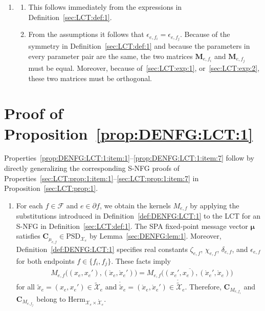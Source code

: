 \documentclass[journal]{IEEEtran}
\newcommand{\add}[1]{{\color{black}#1}}
\newcommand{\vect}[1]{ \bm{#1} }
\newcommand{\set}[1]{\mathcal{#1}}
\newcommand{\setF}{ \mathcal{F} }
\newcommand{\setpf}{ \partial f }
\newcommand{\xe}{ x_{e} }
\newcommand{\vmu}{ \vect{ \mu } }
\newcommand{\setHerm}[1]{ \mathrm{Herm}_{#1} }
\newcommand{\setPSD}[1]{ \mathrm{PSD}_{#1} }
\newcommand{\tset}[1]{\tilde{\mathcal{#1}}}
\newcommand{\matr}[1]{\vect{#1}}
\newcommand{\LCTtset}[1]{\mathring{\tilde{\mathcal{#1}}}}
\newcommand{\LCTset}[1]{\mathring{\mathcal{#1}}}
\newcommand{\LCT}[1]{ \mathring{#1} }
\newcommand{\LCTt}[1]{ \mathring{ \tilde{#1} } }
\newcommand{\ef}{ e,f }
\newcommand{\efi}{ e,f_i }
\newcommand{\efj}{ e,f_j }
\newcommand{\txe}{ \tilde{x}_{e} }
\begin{document}
\begin{appendices}
\begin{enumerate}
    \item
          \begin{enumerate}

            \item This follows immediately from the expressions in
                  Definition~\ref{sec:LCT:def:1}.

            \item From the assumptions it follows that
                  $\epsilon_{\efi} = \epsilon_{\efj}$. Because of the symmetry in
                  Definition~\ref{sec:LCT:def:1} and because the parameters in every
                  parameter pair are the same, the two matrices
                  $\matr{M}_{\efi}$ and
                  $\matr{M}_{\efj}$ must be
                  equal. Moreover, because of~\eqref{sec:LCT:exp:1},
                  or~\eqref{sec:LCT:exp:2}, these two matrices must be
                  orthogonal.

          \end{enumerate}

  \end{enumerate}

  \section{Proof of Proposition~\ref{prop:DENFG:LCT:1}}
  \label{apx:LCT DENFGs}
  \add{Properties~\ref{prop:DENFG:LCT:1:item:1}--\ref{prop:DENFG:LCT:1:item:7} follow by directly generalizing the
    corresponding S-NFG proofs of Properties~\ref{sec:LCT:prop:1:item:1}--\ref{sec:LCT:prop:1:item:7} in Proposition~\ref{sec:LCT:prop:1}.}
  \begin{enumerate}

    \item[8)] For each $ f \in \setF $ and $ e \in \setpf $, we obtain the kernels
          $ M_{\ef} $ by applying the substitutions introduced in Definition~\ref{def:DENFG:LCT:1} to the LCT for an S-NFG in Definition~\ref{sec:LCT:def:1}.
          The SPA fixed-point message vector $ \vmu $ satisfies
          $ \matr{C}_{ \mu_{\ef} } \in \setPSD{\set{X}_{e}} $ by Lemma~\ref{sec:DENFG:lem:1}. Moreover, Definition~\ref{def:DENFG:LCT:1} specifies real constants $\zeta_{e,f}$, $\chi_{e,f}$, $\delta_{e,f}$, and $\epsilon_{e,f}$ for both endpoints $f\in\{f_i,f_j\}$. These facts imply
          \begin{align*}
             & M_{\ef}\bigl( (\xe, \xe') ,(\LCT{x}_{e}, \LCT{x}_{e}') \bigr)
            = \overline{ M_{\ef}\bigl( (\xe', \xe) ,(\LCT{x}_{e}', \LCT{x}_{e}) \bigr) }
          \end{align*}
          for all $
            \txe = (\xe, \xe') \in \tset{X}_{e}
          $ and $
            \LCTt{x}_{e} = ( \LCT{x}_{e}, \LCT{x}_{e}' ) \in \LCTtset{X}_{e}$.
          Therefore, $ \matr{C}_{ M_{\efi} }$ and
          $\matr{C}_{ M_{\efj} }$ belong to
          $\setHerm{\set{X}_e\times\LCTset{X}_e}$.


\end{enumerate}
\end{appendices}
\end{document}
